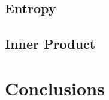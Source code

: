 \documentclass[10pt, conference]{IEEEtran}
\begin{document}
\subsection{Entropy}

\subsection{Inner Product}

\section{Conclusions}




\end{document}
